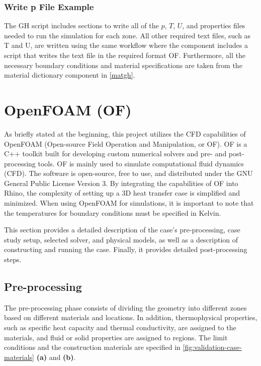 \subsubsection{Write p File Example}
The \gls{GH} script includes sections to write all of the $p$, $T$, $U$, and properties files needed to run the simulation for each zone. All other required text files, such as T and U, are written using the same workflow where the component includes a script that writes the text file in the required format \gls{OF}. Furthermore, all the necessary boundary conditions and material specifications are taken from the material dictionary component in \cref{matgh}.


















\section[OpenFOAM]{OpenFOAM (OF)}
As briefly stated at the beginning, this project utilizes the CFD capabilities of OpenFOAM (Open-source Field Operation and Manipulation, or OF).  \gls{OF} is a C++ toolkit built for developing custom numerical solvers and pre- and post-processing tools. \gls{OF} is mainly used to simulate computational fluid dynamics (CFD). The software is open-source, free to use, and distributed under the GNU General Public License Version 3.
By integrating the capabilities of \gls{OF} into Rhino, the complexity of setting up a 3D heat transfer case is simplified and minimized. When using OpenFOAM for simulations, it is important to note that the temperatures for boundary conditions must be specified in Kelvin.

This section provides a detailed description of the case's pre-processing, case study setup, selected solver, and physical models, as well as a description of constructing and running the case. 
Finally, it provides detailed post-processing steps.



\subsection{Pre-processing}
The pre-processing phase consists of dividing the geometry into different zones based on different materials and locations. In addition, thermophysical properties, such as specific heat capacity and thermal conductivity, are assigned to the materials, and fluid or solid properties are assigned to regions. The limit conditions and the construction materials are specified in \cref{fig:validation-case-materials} \textbf{(a)} and \textbf{(b)}. 


